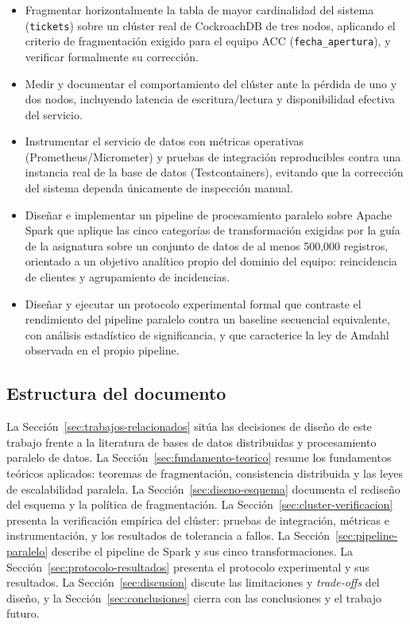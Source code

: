 \documentclass[11pt,letterpaper]{article}
\begin{document}
\begin{itemize}[leftmargin=1.5em]
    \item Fragmentar horizontalmente la tabla de mayor cardinalidad del sistema
        (\texttt{tickets}) sobre un clúster real de CockroachDB de tres nodos, aplicando el
        criterio de fragmentación exigido para el equipo ACC (\texttt{fecha\_apertura}), y
        verificar formalmente su corrección.
    \item Medir y documentar el comportamiento del clúster ante la pérdida de uno y dos nodos,
        incluyendo latencia de escritura/lectura y disponibilidad efectiva del servicio.
    \item Instrumentar el servicio de datos con métricas operativas (Prometheus/Micrometer) y
        pruebas de integración reproducibles contra una instancia real de la base de datos
        (Testcontainers), evitando que la corrección del sistema dependa únicamente de
        inspección manual.
    \item Diseñar e implementar un pipeline de procesamiento paralelo sobre Apache Spark que
        aplique las cinco categorías de transformación exigidas por la guía de la asignatura
        sobre un conjunto de datos de al menos 500{,}000 registros, orientado a un objetivo
        analítico propio del dominio del equipo: reincidencia de clientes y agrupamiento de
        incidencias.
    \item Diseñar y ejecutar un protocolo experimental formal que contraste el rendimiento del
        pipeline paralelo contra un baseline secuencial equivalente, con análisis estadístico de
        significancia, y que caracterice la ley de Amdahl~\cite{amdahl1967validity} observada en
        el propio pipeline.
\end{itemize}

\subsection{Estructura del documento}

La Sección~\ref{sec:trabajos-relacionados} sitúa las decisiones de diseño de este trabajo frente a
la literatura de bases de datos distribuidas y procesamiento paralelo de datos. La
Sección~\ref{sec:fundamento-teorico} resume los fundamentos teóricos aplicados: teoremas de
fragmentación, consistencia distribuida y las leyes de escalabilidad paralela. La
Sección~\ref{sec:diseno-esquema} documenta el rediseño del esquema y la política de fragmentación.
La Sección~\ref{sec:cluster-verificacion} presenta la verificación empírica del clúster: pruebas
de integración, métricas e instrumentación, y los resultados de tolerancia a fallos. La
Sección~\ref{sec:pipeline-paralelo} describe el pipeline de Spark y sus cinco transformaciones. La
Sección~\ref{sec:protocolo-resultados} presenta el protocolo experimental y sus resultados. La
Sección~\ref{sec:discusion} discute las limitaciones y \emph{trade-offs} del diseño, y la
Sección~\ref{sec:conclusiones} cierra con las conclusiones y el trabajo futuro.
\end{document}
